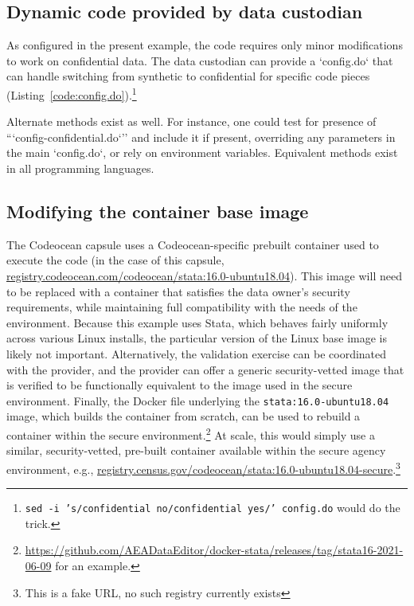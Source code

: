 \documentclass[]{hdsr}
\begin{document}
\subsection{Dynamic code provided by data custodian}

As configured in the present example, the code requires only minor modifications to work on confidential data. The data custodian can provide a `config.do`  that can handle switching from synthetic to confidential for specific code pieces (Listing~\ref{code:config.do}).\footnote{\texttt{sed -i 's/confidential no/confidential yes/' config.do} would do the trick.}



Alternate methods exist as well. For instance, one could test for presence of ```config-confidential.do`'' and include it if present, overriding any parameters in the main `config.do`, or rely on environment variables. Equivalent methods exist in all programming languages.

\subsection{Modifying the container base image}

The Codeocean capsule uses a Codeocean-specific prebuilt container used to execute the code (in the case of this capsule, \url{registry.codeocean.com/codeocean/stata:16.0-ubuntu18.04}). This image will need to be replaced with a container that satisfies the data owner's security requirements, while maintaining full compatibility with the needs of the environment. Because this example uses Stata, which behaves fairly uniformly across various Linux installs, the particular version of the Linux base image is likely not important.   Alternatively, the validation exercise can be coordinated with the provider, and the provider can offer a generic security-vetted image that is verified to be functionally equivalent to the image used in the secure environment. Finally, the Docker file underlying the \texttt{stata:16.0-ubuntu18.04} image, which builds the container from scratch, can be used to rebuild a container within the secure environment.\footnote{\href{github.com/AEADataEditor/docker-stata/releases/tag/stata16-2021-06-09}{https://github.com/AEADataEditor/docker-stata/releases/tag/stata16-2021-06-09} for an example.} At scale, this would simply use a similar, security-vetted, pre-built container available within the secure agency environment, e.g., \url{registry.census.gov/codeocean/stata:16.0-ubuntu18.04-secure}.\footnote{This is a fake URL, no such registry currently exists}
\end{document}
